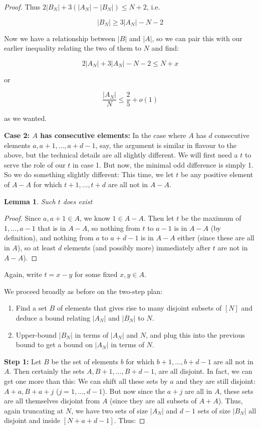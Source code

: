 \documentclass{article}
\newtheorem{lemma}[theorem]{Lemma}
\theoremstyle{definition}
\theoremstyle{remark}
\numberwithin{equation}{section}
\begin{document}
\begin{proof}
Thus $2|B_N| + 3(|A_N| - |B_N|) \leq N+2$, i.e.

\[|B_N| \geq 3|A_N| - N - 2\]

Now we have a relationship between $|B|$ and $|A|$, so we can pair
this with our earlier inequality relating the two of them to $N$ and
find:

\[2|A_N| + 3|A_N| - N - 2 \leq N+x \]

or
 
\[\frac{|A_N|}{N} \leq \frac25+o(1) \]

as we wanted.

\textbf{Case 2: $A$ has consecutive elements:} In the case where $A$
has $d$ consecutive elements $a, a+1, \ldots, a+d-1$, say, the
argument is similar in flavour to the above, but the technical details
are all slightly different.  We will first need a $t$ to serve the
role of our $t$ in case 1.  But now, the minimal odd difference is
simply 1.  So we do something slightly different: This time, we let
$t$ be any positive element of $A-A$ for which $t+1, \ldots, t+d$ are
all not in $A-A$.  

\begin{lemma}Such $t$ does exist\end{lemma}

\begin{proof}Since $a, a+1 \in A$, we know $1 \in A-A$.  Then let $t$
  be the maximum of $1, \ldots, a-1$ that is in $A-A$, so nothing from
  $t$ to $a-1$ is in $A-A$ (by definition), and nothing from $a$ to
  $a+d-1$ is in $A-A$ either (since these are all in $A$), so at least
  $d$ elements (and possibly more) immediately after $t$ are not in
  $A-A$).
\end{proof}

Again, write $t = x-y$ for some fixed $x, y \in A$.

We proceed broadly as before on the two-step plan: 

\begin{enumerate}
\item Find a set $B$ of elements that gives rise to many disjoint
  subsets of $[N]$ and deduce a bound relating $|A_N|$ and $|B_N|$ to
  $N$.
\item Upper-bound $|B_N|$ in terms of $|A_N|$ and $N$, and plug this
  into the previous bound to get a bound on $|A_N|$ in terms of $N$.
\end{enumerate}

\textbf{Step 1: }Let $B$ be the set of elements $b$ for which
$b+1, \ldots, b+d-1$ are all not in $A$.  Then certainly the sets
$A, B+1, \ldots, B+d-1$, are all disjoint.  In fact, we can get one
more than this: We can shift all these sets by $a$ and they are still
disjoint: $A+a, B+a+j$ ($j=1, \ldots, d-1$).  But now since the $a+j$
are all in $A$, these sets are all themselves disjoint from $A$ (since
they are all subsets of $A+A$).  Thus, again truncating at $N$, we
have two sets of size $|A_N|$ and $d-1$ sets of size $|B_N|$ all
disjoint and inside $[N+a+d-1]$.  Thus:


\end{proof}
\end{document}
